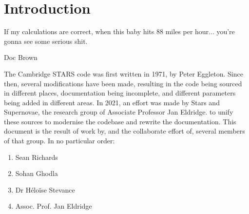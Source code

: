 \chapter{Introduction}

\epigraph{If my calculations are correct, when this baby hits 88 miles per hour... you're gonna see some serious shit.}{Doc Brown}

The Cambridge STARS code was first written in 1971, by Peter Eggleton. Since then, several modifications have been made, resulting in the code being sourced in different places, documentation being incomplete, and different parameters being added in different areas. In 2021, an effort was made by Stars and Supernovae, the research group of Associate Professor Jan Eldridge. to unify these sources to modernise the codebase and rewrite the documentation. This document is the result of work by, and the collaborate effort of, several members of that group. In no particular order:

\begin{enumerate}
    \item Sean Richards 
    \item Sohan Ghodla 
    \item Dr H\'elo\"ise Stevance 
    \item Assoc. Prof. Jan Eldridge 
\end{enumerate}